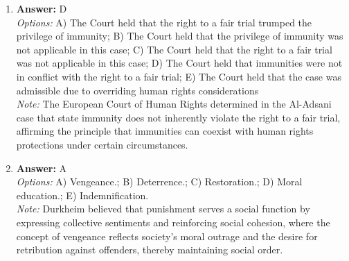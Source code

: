 \documentclass[12pt]{article}
\begin{document}
\begin{enumerate}[label=\arabic*.]
\item \textbf{Answer:} D
\\ \textit{Options:} A) The Court held that the right to a fair trial trumped the privilege of immunity; B) The Court held that the privilege of immunity was not applicable in this case; C) The Court held that the right to a fair trial was not applicable in this case; D) The Court held that immunities were not in conflict with the right to a fair trial; E) The Court held that the case was admissible due to overriding human rights considerations
\\ \textit{Note:} The European Court of Human Rights determined in the Al-Adsani case that state immunity does not inherently violate the right to a fair trial, affirming the principle that immunities can coexist with human rights protections under certain circumstances.
\item \textbf{Answer:} A
\\ \textit{Options:} A) Vengeance.; B) Deterrence.; C) Restoration.; D) Moral education.; E) Indemnification.
\\ \textit{Note:} Durkheim believed that punishment serves a social function by expressing collective sentiments and reinforcing social cohesion, where the concept of vengeance reflects society's moral outrage and the desire for retribution against offenders, thereby maintaining social order.
\end{enumerate}
\end{document}
